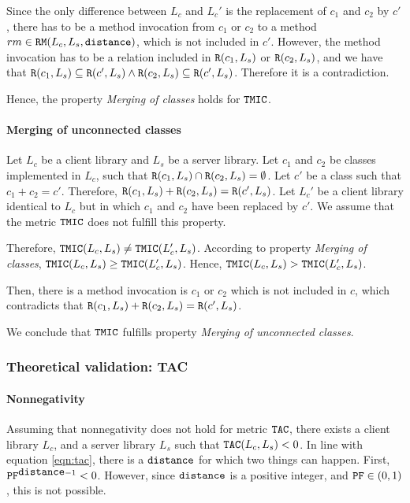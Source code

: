 Since the only difference between $L_c$ and $L_c'$ is the replacement of $c_1$ and $c_2$ by $c'$, there has to be a method invocation from $c_1$ or $c_2$ to a method $rm \in \verb|RM|(L_c,L_s,\verb|distance|)$, which is not included in $c'$. However, the method invocation has to be a relation included in $\verb|R|(c_1, L_s)$ or $\verb|R|(c_2, L_s)$, and we have that $\verb|R|(c_1, L_s) \subseteq \verb|R|(c', L_s) \land \verb|R|(c_2, L_s) \subseteq \verb|R|(c', L_s)$. Therefore it is a contradiction.

Hence, the property \textit{Merging of classes} holds for $\verb|TMIC|$.

\paragraph{Merging of unconnected classes}
Let $L_c$ be a client library and $L_s$ be a server library. Let $c_1$ and $c_2$ be classes implemented in $L_c$, such that $\verb|R|(c_1, L_s) \cap \verb|R|(c_2, L_s) = \emptyset$. Let $c'$ be a class such that $c_1 + c_2 = c'$. Therefore, $\verb|R|(c_1, L_s) + \verb|R|(c_2, L_s) = \verb|R|(c', L_s)$. Let $L_c'$ be a client library identical to $L_c$ but in which $c_1$ and $c_2$ have been replaced by $c'$. We assume that the metric $\verb|TMIC|$ does not fulfill this property.

Therefore, $\verb|TMIC|(L_c, L_s) \neq \verb|TMIC|(L_c', L_s)$. According to property \textit{Merging of classes}, $\verb|TMIC|(L_c, L_s) \geq \verb|TMIC|(L_c', L_s)$. Hence, $\verb|TMIC|(L_c, L_s) > \verb|TMIC|(L_c', L_s)$.

Then, there is a method invocation is $c_1$ or $c_2$ which is not included in $c$, which contradicts that $\verb|R|(c_1, L_s) + \verb|R|(c_2, L_s) = \verb|R|(c', L_s)$.

We conclude that $\verb|TMIC|$ fulfills property \textit{Merging of unconnected classes}.

\subsubsection{Theoretical validation: TAC}

\paragraph{Nonnegativity}
Assuming that nonnegativity does not hold for metric $\verb|TAC|$, there exists a client library $L_c$, and a server library $L_s$ such that $\verb|TAC|(L_c, L_s) < 0$. In line with equation \ref{eqn:tac}, there is a $\verb|distance|$ for which two things can happen. First, $\verb|PF|^{\verb|distance| - 1} < 0$. However, since $\verb|distance|$ is a positive integer, and $\verb|PF| \in (0,1)$, this is not possible.

